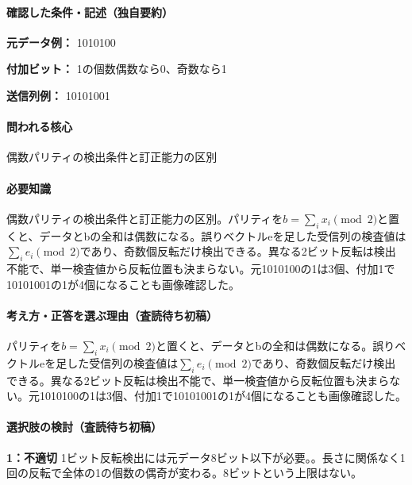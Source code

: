 \paragraph{確認した条件・記述（独自要約）}\mbox{}\par

\noindent\textbf{元データ例：} 1010100\par

\noindent\textbf{付加ビット：} 1の個数偶数なら0、奇数なら1\par

\noindent\textbf{送信列例：} 10101001\par

\paragraph{問われる核心} 偶数パリティの検出条件と訂正能力の区別

\paragraph{必要知識} 偶数パリティの検出条件と訂正能力の区別。パリティを\(b=\sum_ix_i\pmod2\)と置くと、データとbの全和は偶数になる。誤りベクトルeを足した受信列の検査値は\(\sum_ie_i\pmod2\)であり、奇数個反転だけ検出できる。異なる2ビット反転は検出不能で、単一検査値から反転位置も決まらない。元1010100の1は3個、付加1で10101001の1が4個になることも画像確認した。

\paragraph{考え方・正答を選ぶ理由（査読待ち初稿）} パリティを\(b=\sum_ix_i\pmod2\)と置くと、データとbの全和は偶数になる。誤りベクトルeを足した受信列の検査値は\(\sum_ie_i\pmod2\)であり、奇数個反転だけ検出できる。異なる2ビット反転は検出不能で、単一検査値から反転位置も決まらない。元1010100の1は3個、付加1で10101001の1が4個になることも画像確認した。

\paragraph{選択肢の検討（査読待ち初稿）}\mbox{}\par

\noindent\textbf{1：不適切} 1ビット反転検出には元データ8ビット以下が必要。。長さに関係なく1回の反転で全体の1の個数の偶奇が変わる。8ビットという上限はない。\par

